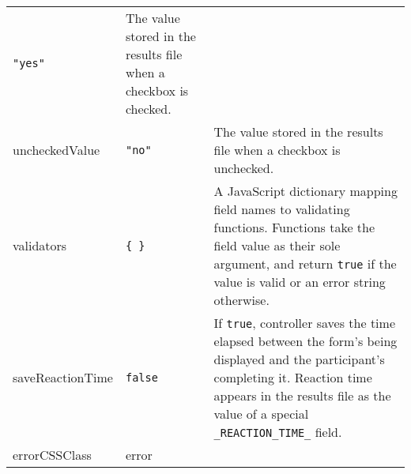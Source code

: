 \documentclass[
]{article}
\begin{document}
\begin{RaggedRight}
\begin{longtable}[]{p{1.7in}p{1in}p{3.15in}}
\begin{minipage}[t]{0.28\columnwidth}
\texttt{"yes"}\strut
\end{minipage} & \begin{minipage}[t]{0.37\columnwidth}\raggedright
The value stored in the results file when a checkbox is checked.\strut
\end{minipage}\tabularnewline
\begin{minipage}[t]{0.26\columnwidth}\raggedright
uncheckedValue\strut
\end{minipage} & \begin{minipage}[t]{0.28\columnwidth}\raggedright
\texttt{"no"}\strut
\end{minipage} & \begin{minipage}[t]{0.37\columnwidth}\raggedright
The value stored in the results file when a checkbox is unchecked.\strut
\end{minipage}\tabularnewline
\begin{minipage}[t]{0.26\columnwidth}\raggedright
validators\strut
\end{minipage} & \begin{minipage}[t]{0.28\columnwidth}\raggedright
\texttt{\{\ \}}\strut
\end{minipage} & \begin{minipage}[t]{0.37\columnwidth}\raggedright
A JavaScript dictionary mapping field names to validating functions.
Functions take the field value as their sole argument, and return
\texttt{true} if the value is valid or an error string otherwise.\strut
\end{minipage}\tabularnewline
\begin{minipage}[t]{0.26\columnwidth}\raggedright
saveReactionTime\strut
\end{minipage} & \begin{minipage}[t]{0.28\columnwidth}\raggedright
\texttt{false}\strut
\end{minipage} & \begin{minipage}[t]{0.37\columnwidth}\raggedright
If \texttt{true}, controller saves the time elapsed between the form's
being displayed and the participant's completing it. Reaction time
appears in the results file as the value of a special
\texttt{\_REACTION\_TIME\_} field.\strut
\end{minipage}\tabularnewline
\begin{minipage}[t]{0.26\columnwidth}\raggedright
errorCSSClass\strut
\end{minipage} & \begin{minipage}[t]{0.28\columnwidth}\raggedright
error\strut
\end{minipage} & \begin{minipage}[t]{0.37\columnwidth}\raggedright

\end{minipage}
\end{longtable}
\end{RaggedRight}
\end{document}
